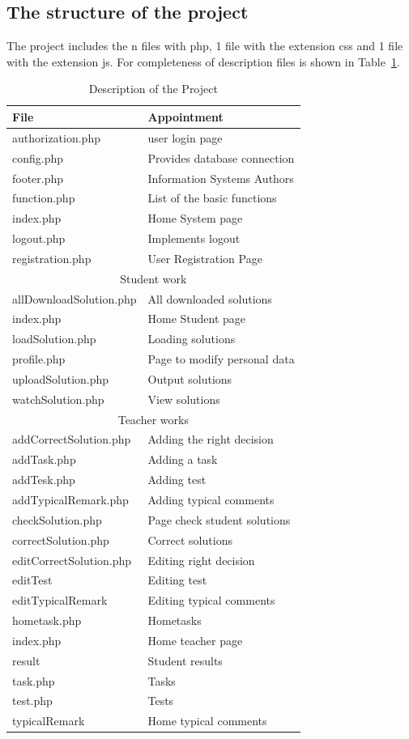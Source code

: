 \documentclass{acmtog} %
\begin{document}
\subsection{The structure of the project}
The project includes the n files with php, 1 file with the extension css and 1 file with the extension js. For completeness of description files is shown in Table~\ref{tr}.\\
\begin{table}[h]
\begin{center}
\begin{tabular}{|l|l|}
\hline
File & Appointment \\
\hline
authorization.php & user login page \\
config.php & Provides database connection \\
footer.php & Information Systems Authors \\
function.php & List of the basic functions \\
index.php & Home System page\\
logout.php & Implements logout \\
registration.php & User Registration Page \\ \hline
\multicolumn{2}{|c|}{Student work}\\ \hline
allDownloadSolution.php & All downloaded solutions \\
index.php & Home Student page \\
loadSolution.php & Loading solutions \\
profile.php & Page to modify personal data \\
uploadSolution.php & Output solutions \\
watchSolution.php & View solutions \\ \hline
\multicolumn{2}{|c|}{Teacher works}\\ \hline
addCorrectSolution.php & Adding the right decision \\
addTask.php & Adding a task\\
addTesk.php & Adding test\\
addTypicalRemark.php & Adding typical comments\\
checkSolution.php & Page check student solutions\\
correctSolution.php & Correct solutions \\
editCorrectSolution.php & Editing right decision \\
editTest & Editing test\\
editTypicalRemark & Editing typical comments\\
hometask.php & Hometasks \\
index.php & Home teacher page\\
result & Student results\\
task.php & Tasks \\
test.php & Tests \\
typicalRemark & Home typical comments \\ \hline
\end{tabular}
\caption{Description of the Project}
\label{tr}
\end{center}
\end{table}
\end{document}
